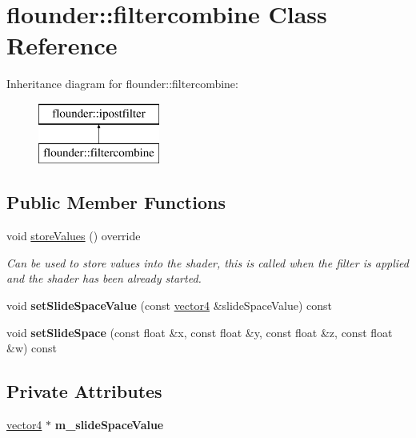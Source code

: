 \hypertarget{classflounder_1_1filtercombine}{}\section{flounder\+:\+:filtercombine Class Reference}
\label{classflounder_1_1filtercombine}
Inheritance diagram for flounder\+:\+:filtercombine\+:\begin{figure}[H]
\begin{center}
\leavevmode
\includegraphics[height=2.000000cm]{classflounder_1_1filtercombine}
\end{center}
\end{figure}
\subsection*{Public Member Functions}
\begin{DoxyCompactItemize}
\item 
void \hyperlink{classflounder_1_1filtercombine_a0ec0634422d3ed539045d9fcfa3d119e}{store\+Values} () override
\begin{DoxyCompactList}\small\item\em Can be used to store values into the shader, this is called when the filter is applied and the shader has been already started. \end{DoxyCompactList}\item 
\mbox{\label{classflounder_1_1filtercombine_a0eb5b961376d95de3dc47362edc3d3b8}} 
void {\bfseries set\+Slide\+Space\+Value} (const \hyperlink{classflounder_1_1vector4}{vector4} \&slide\+Space\+Value) const
\item 
\mbox{\label{classflounder_1_1filtercombine_a5780a2cd0bbf118903cd029598d3a43a}} 
void {\bfseries set\+Slide\+Space} (const float \&x, const float \&y, const float \&z, const float \&w) const
\end{DoxyCompactItemize}
\subsection*{Private Attributes}
\begin{DoxyCompactItemize}
\item 
\mbox{\label{classflounder_1_1filtercombine_a54359b6adfe0a65305325202de649bfe}} 
\hyperlink{classflounder_1_1vector4}{vector4} $\ast$ {\bfseries m\+\_\+slide\+Space\+Value}
\end{DoxyCompactItemize}
